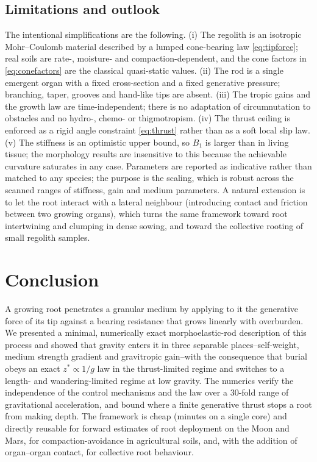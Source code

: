 \documentclass[preprint,12pt]{elsarticle}
\begin{document}
\subsection{Limitations and outlook}
The intentional simplifications are the following. (i) The regolith is an
isotropic Mohr--Coulomb material described by a lumped cone-bearing law
\eqref{eq:tipforce}; real soils are rate-, moisture- and
compaction-dependent, and the cone factors in \eqref{eq:conefactors} are the
classical quasi-static values. (ii) The rod is a single emergent organ with a
fixed cross-section and a fixed generative pressure; branching, taper,
grooves and hand-like tips are absent. (iii) The tropic gains and the growth
law are time-independent; there is no adaptation of circumnutation to
obstacles and no hydro-, chemo- or thigmotropism. (iv) The thrust ceiling is
enforced as a rigid angle constraint \eqref{eq:thrust} rather than as a soft
local slip law. (v) The stiffness is an optimistic upper bound, so $B_1$ is
larger than in living tissue; the morphology results are insensitive to this
because the achievable curvature saturates in any case. Parameters are
reported as indicative rather than matched to any species; the purpose is the
scaling, which is robust across the scanned ranges of stiffness, gain and
medium parameters. A natural extension is to let the root interact with a
lateral neighbour (introducing contact and friction between two growing
organs), which turns the same framework toward root intertwining and
clumping in dense sowing, and toward the collective rooting of small
regolith samples.

\section{Conclusion}
\label{sec:conclusion}

A growing root penetrates a granular medium by applying to it the generative
force of its tip against a bearing resistance that grows linearly with
overburden. We presented a minimal, numerically exact morphoelastic-rod
description of this process and showed that gravity enters it in three
separable places--self-weight, medium strength gradient and gravitropic
gain--with the consequence that burial obeys an exact $z^{*}\propto 1/g$ law
in the thrust-limited regime and switches to a length- and
wandering-limited regime at low gravity. The numerics verify the independence
of the control mechanisms and the law over a 30-fold range of gravitational
acceleration, and bound where a finite generative thrust stops a root from
making depth. The framework is cheap (minutes on a single core) and directly
reusable for forward estimates of root deployment on the Moon and Mars, for
compaction-avoidance in agricultural soils, and, with the addition of
organ--organ contact, for collective root behaviour.
\end{document}
